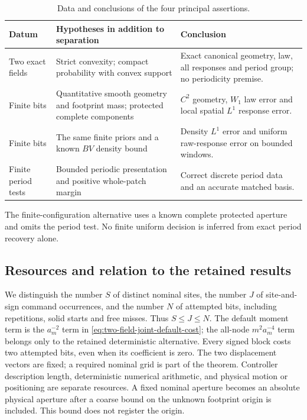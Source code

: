 \begin{table}[ht]
\centering\small
\caption{Data and conclusions of the four principal assertions.}
\label{tab:exact-finite-claims}
\begin{tabular}{@{}p{}p{}p{}@{}}
\toprule
Datum & Hypotheses in addition to separation & Conclusion\\
\midrule
Two exact fields & Strict convexity; compact probability with convex
support & Exact canonical geometry, law, all responses and period
 group; no periodicity premise.\\[4pt]
Finite bits & Quantitative smooth geometry and footprint mass; protected
complete components & $C^2$ geometry, $W_1$ law error and local spatial
$L^1$ response error.\\[4pt]
Finite bits & The same finite priors and a known $BV$ density bound &
Density $L^1$ error and uniform raw-response error on bounded windows.\\[4pt]
Finite period tests & Bounded periodic presentation and positive whole-patch
margin & Correct discrete period data and an accurate matched basis.\\
\bottomrule
\end{tabular}
\end{table}
The finite-configuration alternative uses a known complete protected
aperture and omits the period test. No finite uniform decision is
inferred from exact period recovery alone.

\subsection{Resources and relation to the retained results}
We distinguish the number $S$ of distinct nominal sites, the number
$J$ of site-and-sign command occurrences, and the number $N$ of
attempted bits, including repetitions, solid starts and free misses.
Thus $S\le J\le N$. The default moment term is the
$a_m^{-2}$ term in \eqref{eq:two-field-joint-default-cost}; the
all-node $m^2a_m^{-4}$ term belongs only to the retained deterministic
alternative. Every signed block costs two attempted bits, even when
its coefficient is zero. The two displacement vectors are fixed; a
required nominal grid is part of the theorem. Controller description
length, deterministic numerical arithmetic, and physical motion or
positioning are separate resources. A fixed nominal aperture becomes
an absolute physical aperture after a coarse bound on the unknown
footprint origin is included. This bound does not register the origin.

